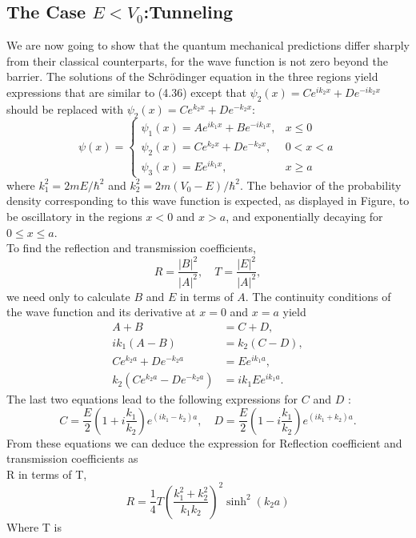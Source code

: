 \subsection{The Case $E<V_0$:Tunneling}
We are now going to show that the quantum mechanical predictions differ sharply from their classical counterparts, for the wave function is not zero beyond the barrier. The solutions of the Schrödinger equation in the three regions yield expressions that are similar to (4.36) except that $\psi_{2}(x)=C e^{i k_{2} x}+D e^{-i k_{2} x}$ should be replaced with $\psi_{2}(x)=C e^{k_{2} x}+D e^{-k_{2} x}:$\\
$$\psi(x)= \begin{cases}\psi_{1}(x)=A e^{i k_{1} x}+B e^{-i k_{1} x}, & x \leq 0 \\ \psi_{2}(x)=C e^{k_{2} x}+D e^{-k_{2} x}, & 0<x<a \\ \psi_{3}(x)=E e^{i k_{1} x}, & x \geq a\end{cases}$$
where $k_{1}^{2}=2 m E / \hbar^{2}$ and $k_{2}^{2}=2 m\left(V_{0}-E\right) / \hbar^{2}$. The behavior of the probability density corresponding to this wave function is expected, as displayed in Figure, to be oscillatory in the regions $x<0$ and $x>a$, and exponentially decaying for $0 \leq x \leq a$.\\
To find the reflection and transmission coefficients,
$$
R=\frac{|B|^{2}}{|A|^{2}}, \quad T=\frac{|E|^{2}}{|A|^{2}},
$$
we need only to calculate $B$ and $E$ in terms of $A$. The continuity conditions of the wave function and its derivative at $x=0$ and $x=a$ yield
$$\begin{aligned}
	A+B &=C+D, \\
	i k_{1}(A-B) &=k_{2}(C-D), \\
	C e^{k_{2} a}+D e^{-k_{2} a} &=E e^{i k_{1} a}, \\
	k_{2}\left(C e^{k_{2} a}-D e^{-k_{2} a}\right) &=i k_{1} E e^{i k_{1} a} .
\end{aligned}$$
The last two equations lead to the following expressions for $C$ and $D$ :
$$
C=\frac{E}{2}\left(1+i \frac{k_{1}}{k_{2}}\right) e^{\left(i k_{1}-k_{2}\right) a}, \quad D=\frac{E}{2}\left(1-i \frac{k_{1}}{k_{2}}\right) e^{\left(i k_{1}+k_{2}\right) a} .
$$
From these equations we can deduce the expression for Reflection coefficient and transmission coefficients as\\
R in terms of T,\\
$$R=\frac{1}{4} T\left(\frac{k_{1}^{2}+k_{2}^{2}}{k_{1} k_{2}}\right)^{2} \sinh ^{2}\left(k_{2} a\right) $$
Where T is \\
